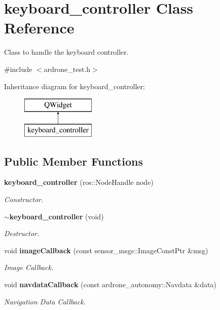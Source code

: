 \section{keyboard\+\_\+controller Class Reference}
\label{classkeyboard__controller}


Class to handle the keyboard controller.  




{\ttfamily \#include $<$ardrone\+\_\+test.\+h$>$}

Inheritance diagram for keyboard\+\_\+controller\+:\begin{figure}[H]
\begin{center}
\leavevmode
\includegraphics[height=2.000000cm]{classkeyboard__controller}
\end{center}
\end{figure}
\subsection*{Public Member Functions}
\begin{DoxyCompactItemize}
\item 
{\bf keyboard\+\_\+controller} (ros\+::\+Node\+Handle node)
\begin{DoxyCompactList}\small\item\em Constructor. \end{DoxyCompactList}\item 
{\bf $\sim$keyboard\+\_\+controller} (void)
\begin{DoxyCompactList}\small\item\em Destructor. \end{DoxyCompactList}\item 
void {\bf image\+Callback} (const sensor\+\_\+msgs\+::\+Image\+Const\+Ptr \&msg)
\begin{DoxyCompactList}\small\item\em Image Callback. \end{DoxyCompactList}\item 
void {\bf navdata\+Callback} (const ardrone\+\_\+autonomy\+::\+Navdata \&data)
\begin{DoxyCompactList}\small\item\em Navigation Data Callback. \end{DoxyCompactList}\end{DoxyCompactItemize}

